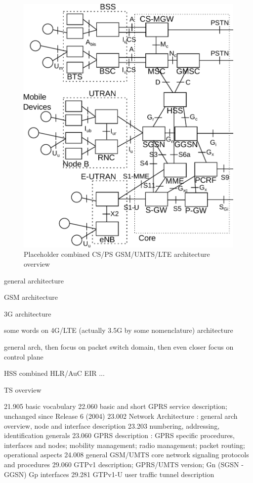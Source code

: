 \begin{figure}[htbp]
	\centering
 	\includegraphics[width=1.0\textwidth]{images/3gpp-physical-arch.pdf}
 	\caption{Placeholder combined CS/PS GSM/UMTS/LTE architecture overview}
 	\label{c4:fig:psdomain}
\end{figure}

general architecture

GSM architecture

3G architecture

some words on 4G/LTE (actually 3.5G by some nomenclature)  architecture

general arch, then focus on packet switch domain, then even closer focus on control plane

\gls{HSS} combined \gls{HLR}/\gls{AuC} \gls{EIR} ...

\gls{TS} overview

21.905 \cite{3gpp.21.905} basic vocabulary
22.060 \cite{3gpp.22.060} basic and short \gls{GPRS} service description; unchanged since Release 6 (2004)
23.002 \cite{3gpp.23.002} Network Architecture : general arch overview, node and interface description
23.203 \cite{3gpp.23.003} numbering, addressing, identification generals
23.060 \cite{3gpp.23.060} \gls{GPRS} description : \gls{GPRS} specific procedures, interfaces and nodes; mobility management; radio management; packet routing; operational aspects
24.008 \cite{3gpp.24.008} general GSM/UMTS core network signaling protocols and procedures
29.060 \cite{3gpp.29.060} GTPv1 description; GPRS/UMTS version; Gn (SGSN - GGSN) Gp interfaces
29.281 \cite{3gpp.29.281} GTPv1-U user traffic tunnel description

